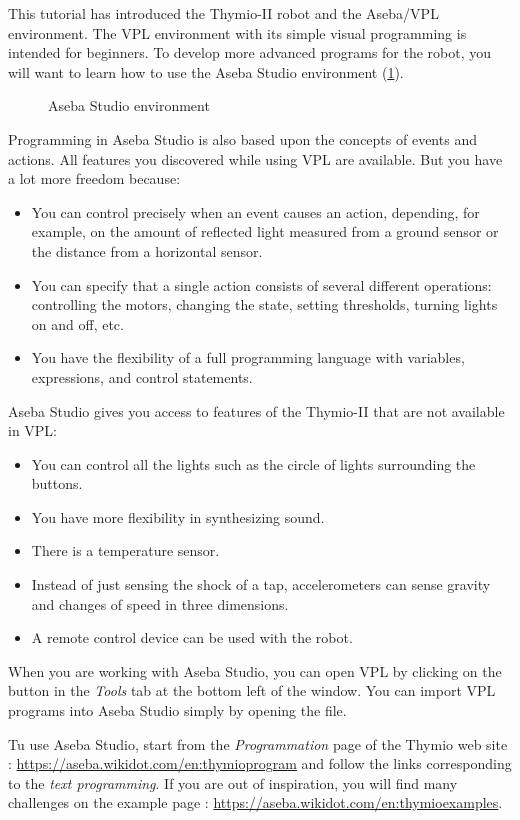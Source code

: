 \label{ch.next}

This tutorial has introduced the Thymio-II robot and the Aseba/VPL
environment. The VPL environment with its simple visual programming is
intended for beginners. To develop more advanced programs for the robot,
you will want to learn how to use the Aseba Studio environment (\cref{fig.studio}).

\begin{figure}[hbt]
\begin{center}
\caption{Aseba Studio environment}\label{fig.studio}
\end{center}
\end{figure}

Programming in Aseba Studio is also based upon the concepts of events
and actions.
All features you discovered while using VPL are available.
But you have a lot more freedom because:
\begin{itemize}
\item You can control precisely when an event causes an action, depending, for
example, on the amount of reflected light measured from a ground sensor or
the distance from a horizontal sensor.
\item You can specify that a single action consists of several different
operations: controlling the motors, changing the state, setting
thresholds, turning lights on and off, etc.
\item You have the flexibility of a full programming language with
variables, expressions, and control statements.
\end{itemize}

Aseba Studio gives you access to features of the Thymio-II that are not
available in VPL:

\begin{itemize}
\item You can control all the lights such as the circle of lights
surrounding the buttons.
\item You have more flexibility in synthesizing sound.
\item There is a temperature sensor.
\item Instead of just sensing the shock of a tap, accelerometers
can sense gravity and changes of speed in three dimensions.
\item A remote control device can be used with the robot.
\end{itemize}
When you are working with Aseba Studio, you can open VPL by clicking on
the button  in the \emph{Tools} tab at the bottom left of the window.
You can import VPL programs into Aseba Studio simply by opening the file.

Tu use Aseba Studio, start from the \emph{Programmation} page of the Thymio web site : \url{https://aseba.wikidot.com/en:thymioprogram} and follow the links corresponding to the \emph{text programming}.
If you are out of inspiration, you will find many challenges on the example page :  \url{https://aseba.wikidot.com/en:thymioexamples}.

\vspace{4em}


